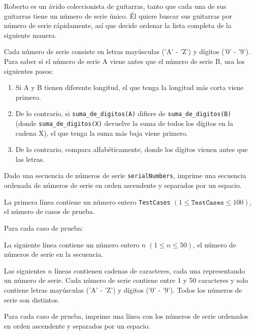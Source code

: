 
Roberto es un ávido coleccionista de guitarras, tanto que cada una de sus guitarras tiene un número de serie único. Él quiere buscar sus guitarras por número de serie rápidamente, así que decide ordenar la lista completa de la siguiente manera.

Cada número de serie consiste en letras mayúsculas ('A' - 'Z') y dígitos ('0' - '9'). Para saber si el número de serie A viene antes que el número de serie B, usa los siguientes pasos:

\begin{enumerate}
    \item Si A y B tienen diferente longitud, el que tenga la longitud más corta viene primero.
    \item De lo contrario, si \texttt{suma\_de\_digitos(A)} difiere de \texttt{suma\_de\_digitos(B)} (donde \texttt{suma\_de\_digitos(X)} devuelve la suma de todos los dígitos en la cadena X), el que tenga la suma más baja viene primero.
    \item De lo contrario, compara alfabéticamente, donde los dígitos vienen antes que las letras.
\end{enumerate}

Dado una secuencia de números de serie \texttt{serialNumbers}, imprime una secuencia ordenada de números de serie en orden ascendente y separados por un espacio.


La primera línea contiene un número entero \texttt{TestCases} $(1 \le \texttt{TestCases} \le 100)$, el número de casos de prueba.

Para cada caso de prueba:

La siguiente línea contiene un número entero $n$ $(1 \le n \le 50)$, el número de números de serie en la secuencia.

Las siguientes $n$ líneas contienen cadenas de caracteres, cada una representando un número de serie. Cada número de serie contiene entre 1 y 50 caracteres y solo contiene letras mayúsculas ('A' - 'Z') y dígitos ('0' - '9'). Todos los números de serie son distintos.

\outputText

Para cada caso de prueba, imprime una línea con los números de serie ordenados en orden ascendente y separados por un espacio.

\exampleCases

\begin{example}
\end{example}

